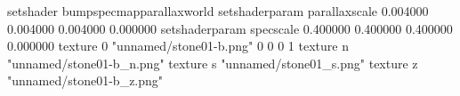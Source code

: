 setshader bumpspecmapparallaxworld
setshaderparam parallaxscale 0.004000 0.004000 0.004000 0.000000
setshaderparam specscale 0.400000 0.400000 0.400000 0.000000
texture 0 "unnamed/stone01-b.png" 0 0 0 1
texture n "unnamed/stone01-b_n.png"
texture s "unnamed/stone01_s.png"
texture z "unnamed/stone01-b_z.png"